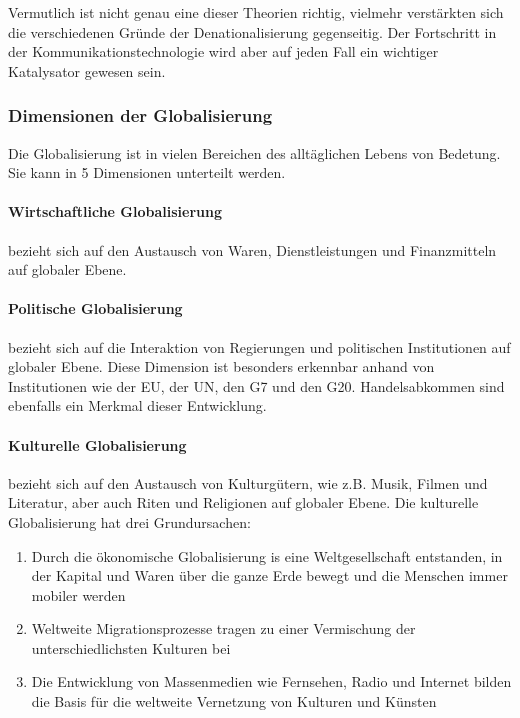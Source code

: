 \documentclass{article}
\begin{document}
	Vermutlich ist nicht genau eine dieser Theorien richtig, vielmehr verstärkten sich die verschiedenen Gründe der Denationalisierung gegenseitig. Der Fortschritt in der Kommunikationstechnologie wird aber auf jeden Fall ein wichtiger Katalysator gewesen sein.

	\subsubsection{Dimensionen der Globalisierung}
	Die Globalisierung ist in vielen Bereichen des alltäglichen Lebens von Bedetung. Sie kann in 5 Dimensionen unterteilt werden.

	\paragraph{Wirtschaftliche Globalisierung}
	bezieht sich auf den Austausch von Waren, Dienstleistungen und Finanzmitteln auf globaler Ebene.	

	\paragraph{Politische Globalisierung}
	bezieht sich auf die Interaktion von Regierungen und politischen Institutionen auf globaler Ebene. Diese Dimension ist besonders erkennbar anhand von Institutionen wie der EU, der UN, den G7 und den G20. Handelsabkommen sind ebenfalls ein Merkmal dieser Entwicklung.

	\paragraph{Kulturelle Globalisierung}
	bezieht sich auf den Austausch von Kulturgütern, wie z.B. Musik, Filmen und Literatur, aber auch Riten und Religionen auf globaler Ebene. Die kulturelle Globalisierung hat drei Grundursachen:

	\begin{enumerate}
		\item Durch die ökonomische Globalisierung is eine Weltgesellschaft entstanden, in der Kapital und Waren über die ganze Erde bewegt und die Menschen immer mobiler werden
		\item Weltweite Migrationsprozesse tragen zu einer Vermischung der unterschiedlichsten Kulturen bei
		\item Die Entwicklung von Massenmedien wie Fernsehen, Radio und Internet bilden die Basis für die weltweite Vernetzung von Kulturen und Künsten
	\end{enumerate}
\end{document}
